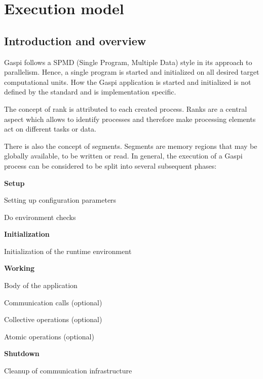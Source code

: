 \documentclass{article}
\newlength{\st}\setlength{\st}{0pt}
\newcommand{\GASPI}{{\sc Gaspi}}
\begin{document}
\section{Execution model}

\subsection{Introduction and overview}
\label{SubSec:ExecPhases}

\GASPI{} follows a SPMD (Single Program, Multiple Data) style in its
approach to parallelism. Hence, a single program is started and initialized
on all desired target computational units. How the \GASPI{} application is started and initialized
is not defined by the standard and is implementation specific.

The concept of rank is attributed to each created process. Ranks are
a central aspect which allows to identify processes and therefore make
processing elements act on different tasks or data.

There is also the concept of segments. Segments are memory regions
that may be globally available, to be written or read. In general,
the execution of a \GASPI{} process can be considered to be split
into several subsequent phases:

\begin{itemize}
\item \textbf{Setup}
  \begin{description}
  \item Setting up configuration parameters
  \item Do environment checks
  \end{description}
\item \textbf{Initialization}
  \begin{description}
  \item Initialization of the runtime environment
  \end{description}
\item \textbf{Working}
  \begin{description}
  \item Body of the application
  \begin{description}
    \item Communication calls (optional)
    \item Collective operations (optional)
    \item Atomic operations (optional)
  \end{description}
  \end{description}
\item \textbf{Shutdown}
  \begin{description}
  \item Cleanup of communication infrastructure
  \end{description}
\end{itemize}
\end{document}
